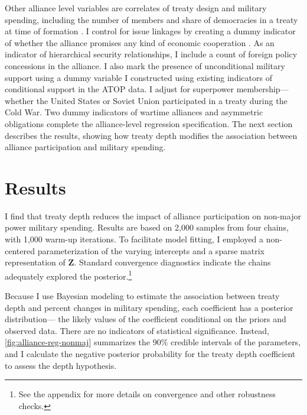 \documentclass[12pt]{article}
\begin{document}
 
Other alliance level variables are correlates of treaty design and military spending, including the number of members and share of democracies in a treaty at time of formation \citep{Chibaetal2015}. 
I control for issue linkages by creating a dummy indicator of whether the alliance promises any kind of economic cooperation \citep{Poast2013, LongLeeds2006}. 
As an indicator of hierarchical security relationships, I include a count of foreign policy concessions in the alliance. 
I also mark the presence of unconditional military support using a dummy variable I constructed using existing indicators of conditional support in the ATOP data. 
I adjust for superpower membership--- whether the United States or Soviet Union participated in a treaty during the Cold War. 
Two dummy indicators of wartime alliances and asymmetric obligations \citep{Leedsetal2002} complete the alliance-level regression specification. 
The next section describes the results, showing how treaty depth modifies the association between alliance participation and military spending. 

 

\section*{Results}


I find that treaty depth reduces the impact of alliance participation on non-major power military spending. 
Results are based on 2,000 samples from four chains, with 1,000 warm-up iterations. 
To facilitate model fitting, I employed a non-centered parameterization of the varying intercepts and a sparse matrix representation of \textbf{Z}. 
Standard convergence diagnostics indicate the chains adequately explored the posterior.\footnote{See the appendix for more details on convergence and other robustness checks.} 


Because I use Bayesian modeling to estimate the association between treaty depth and percent changes in military spending, each coefficient has a posterior distribution--- the likely values of the coefficient conditional on the priors and observed data.
There are no indicators of statistical significance. 
Instead, \autoref{fig:alliance-reg-nonmaj} summarizes the 90\% credible intervals of the parameters, and I calculate the negative posterior probability for the treaty depth coefficient to assess the depth hypothesis.
\end{document}
